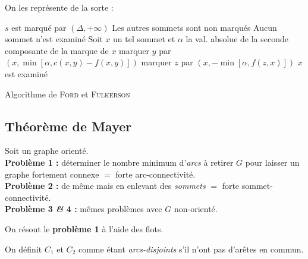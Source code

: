\documentclass[a4paper, 8pt]{article}
\begin{document}
\begin{multicols*}{3}
On les représente de la sorte :
\begin{center}
\end{center}

\begin{algorithm}[H]
 $s$ est marqué par $(\Delta,+\infty)$ \;
 Les autres sommets sont non marqués \;
 Aucun sommet n'est examiné \;
 {
 	 Soit $x$ un tel sommet et $\alpha$ la val. absolue de la seconde composante de la marque de $x$ \;
 	 {
 	 	{
 	 		marquer $y$ par \footnotesize{$\left(x,\min\left[\alpha,c(x,y)-f(x,y)\right]\right)$} \;
 	 	}
 	 }
 	 {
 	 	{
 	 		marquer $z$ par \footnotesize{$\left(x,-\min\left[\alpha,f(z,x)\right]\right)$} \;
 	 	}
 	 }
 	 $x$ est examiné \;
 }
 
 \caption{Algorithme de \textsc{Ford} et \textsc{Fulkerson}}
\end{algorithm}

\subsection*{Théorème de Mayer}
Soit \GXA un graphe orienté.\\
\textbf{Problème 1 :} déterminer le nombre minimum d'\textit{arcs} à retirer $G$ pour laisser un graphe fortement connexe $=$ forte arc-connectivité.\\
\textbf{Problème 2 :} de même mais en enlevant des \textit{sommets} $=$ forte sommet-connectivité.\\
\textbf{Problème 3 \textit{\&} 4 :} mêmes problèmes avec $G$ non-orienté.

On résout le \textbf{problème 1} à l'aide des flots.

On définit $C_1$ et $C_2$ comme étant \emph{arcs-disjoints} s'il n'ont pas d'arêtes en commun.


\end{multicols*}
\end{document}
